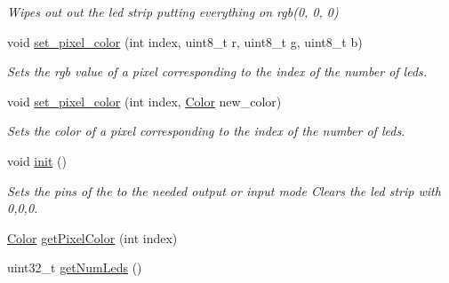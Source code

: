 \begin{DoxyCompactItemize}
\begin{DoxyCompactList}\small\item\em Wipes out out the led strip putting everything on rgb(0, 0, 0) \end{DoxyCompactList}\item 
void \hyperlink{classled__strip_ab99d9332f7007464369c18c29d5d9094}{set\+\_\+pixel\+\_\+color} (int index, uint8\+\_\+t r, uint8\+\_\+t g, uint8\+\_\+t b)
\begin{DoxyCompactList}\small\item\em Sets the rgb value of a pixel corresponding to the index of the number of leds. \end{DoxyCompactList}\item 
void \hyperlink{classled__strip_a0da91ce305d8b014722b3847948b26fd}{set\+\_\+pixel\+\_\+color} (int index, \hyperlink{classColor}{Color} new\+\_\+color)
\begin{DoxyCompactList}\small\item\em Sets the color of a pixel corresponding to the index of the number of leds. \end{DoxyCompactList}\item 
void \hyperlink{classled__strip_a3f587287e6503663c38d9d85a9f100f8}{init} ()\hypertarget{classled__strip_a3f587287e6503663c38d9d85a9f100f8}{}\label{classled__strip_a3f587287e6503663c38d9d85a9f100f8}

\begin{DoxyCompactList}\small\item\em Sets the pins of the to the needed output or input mode Clears the led strip with 0,0,0. \end{DoxyCompactList}\item 
\hyperlink{classColor}{Color} \hyperlink{classled__strip_afd34f14b24fe991a7134723868766c05}{get\+Pixel\+Color} (int index)
\item 
uint32\+\_\+t \hyperlink{classled__strip_ab5480ac4fe12e6159891c3523374a6c2}{get\+Num\+Leds} ()
\end{DoxyCompactItemize}
